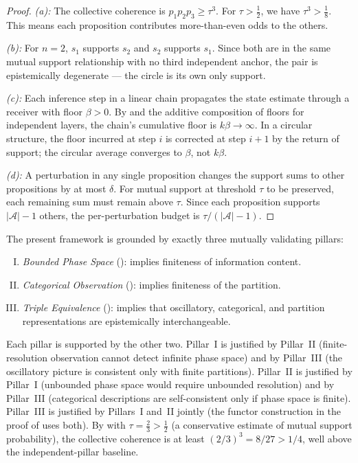 \begin{proof}
\emph{(a):} The collective coherence is $p_1 p_2 p_3 \geq \tau^3$.  For
$\tau > \tfrac{1}{2}$, we have $\tau^3 > \tfrac{1}{8}$.  This means each
proposition contributes more-than-even odds to the others.

\emph{(b):} For $n = 2$, $s_1$ supports $s_2$ and $s_2$ supports $s_1$.
Since both are in the same mutual support relationship with no third
independent anchor, the pair is epistemically degenerate — the circle is
its own only support.

\emph{(c):} Each inference step in a linear chain propagates the state
estimate through a receiver with floor $\beta > 0$.  By 
and the additive composition of floors for independent layers, the chain's
cumulative floor is $k\beta \to \infty$.  In a circular structure, the
floor incurred at step $i$ is corrected at step $i+1$ by the return of
support; the circular average converges to $\beta$, not $k\beta$.

\emph{(d):} A perturbation in any single proposition changes the support
sums to other propositions by at most $\delta$.  For mutual support at
threshold $\tau$ to be preserved, each remaining sum must remain above
$\tau$.  Since each proposition supports $|\mathcal{A}| - 1$ others,
the per-perturbation budget is $\tau / (|\mathcal{A}| - 1)$.
\end{proof}

\begin{remark}
\label{rem:three-pillars}
The present framework is grounded by exactly three mutually validating pillars:
\begin{enumerate}[(I)]
  \item \emph{Bounded Phase Space} (): implies
    finiteness of information content.
  \item \emph{Categorical Observation} (): implies
    finiteness of the partition.
  \item \emph{Triple Equivalence} (): implies
    that oscillatory, categorical, and partition representations are
    epistemically interchangeable.
\end{enumerate}
Each pillar is supported by the other two.  Pillar~I is justified by
Pillar~II (finite-resolution observation cannot detect infinite phase space)
and by Pillar~III (the oscillatory picture is consistent only with finite
partitions).  Pillar~II is justified by Pillar~I (unbounded phase space would
require unbounded resolution) and by Pillar~III (categorical descriptions
are self-consistent only if phase space is finite).  Pillar~III is justified by
Pillars~I and~II jointly (the functor construction in the proof of
 uses both).  By 
with $\tau = \tfrac{2}{3} > \tfrac{1}{2}$ (a conservative estimate of mutual
support probability), the collective coherence is at least $(2/3)^3 =
8/27 > 1/4$, well above the independent-pillar baseline.
\end{remark}

